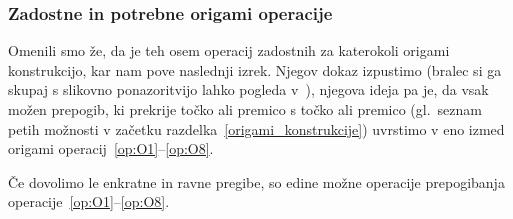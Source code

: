 
\subsubsection*{Zadostne in potrebne origami operacije}
\label{podpogl:zadost_potr_op}

Omenili smo že, da je teh osem operacij zadostnih za katerokoli origami konstrukcijo, kar nam pove naslednji izrek. Njegov dokaz izpustimo (bralec si ga skupaj s slikovno ponazoritvijo lahko pogleda v~\cite[str.\ 24--26 (izrek 1.1)]{hull2020}), njegova ideja pa je, da vsak možen prepogib, ki prekrije točko ali premico s točko ali premico (gl.\ seznam petih možnosti v začetku razdelka~\ref{origami_konstrukcije}) uvrstimo v eno izmed origami operacij~\ref{op:O1}--\ref{op:O8}.

\begin{izrek}
    \label{izr:op1do8}
    Če dovolimo le enkratne in ravne pregibe, so edine možne operacije prepogibanja operacije~\ref{op:O1}--\ref{op:O8}.
\end{izrek}

